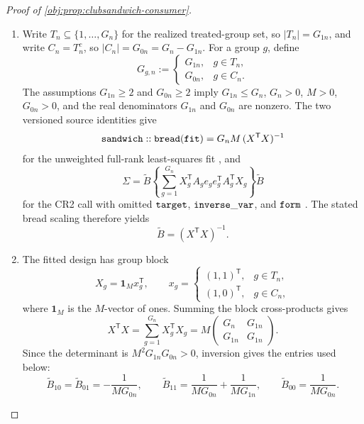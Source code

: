 \documentclass[11pt]{article}
\begin{document}
\begin{proof}[Proof of \cref{obj:prop:clubsandwich-consumer}]
\begin{enumerate}
\item
Write \(T_n\subseteq\{1,\ldots,G_n\}\) for the realized treated-group set, so
\(|T_n|=G_{1n}\), and write \(C_n=T_n^{c}\), so
\(|C_n|=G_{0n}=G_n-G_{1n}\).  For a group \(g\), define
\[
G_{g,n}:=
\begin{cases}
G_{1n},& g\in T_n,\\
G_{0n},& g\in C_n.
\end{cases}
\]
The assumptions \(G_{1n}\ge2\) and \(G_{0n}\ge2\) imply \(G_{1n}\le G_n\),
\(G_n>0\), \(M>0\), \(G_{0n}>0\), and the real denominators
\(G_{1n}\) and \(G_{0n}\) are nonzero.  The two versioned source identities give
\[
{\tt sandwich::bread}({\tt fit})
=
G_nM\,(X^{\mathsf T}X)^{-1}
\]
for the unweighted full-rank least-squares fit
\citep[R/bread.R, lines 10--15]{Sandwich2026}, and
\[
\Sigma
=
\widetilde B
\left\{
\sum_{g=1}^{G_n}X_g^{\mathsf T}A_ge_ge_g^{\mathsf T}A_g^{\mathsf T}X_g
\right\}
\widetilde B
\]
for the CR2 call with omitted \({\tt target}\), \({\tt inverse\_var}\), and
\({\tt form}\)
\citep[R/lm.R, lines 47--52 and 70--72; R/S3-methods.R, lines 21--33 and
63--65; R/clubSandwich.R, lines 167--175, 216--225, and 237--287;
R/CR-adjustments.R, lines 5--7 and 22--42]{ClubSandwich2026}.  The stated bread
scaling therefore yields
\[
\widetilde B=(X^{\mathsf T}X)^{-1}.
\]

\item
The fitted design has group block
\[
X_g=\mathbf 1_M x_g^{\mathsf T},
\qquad
x_g=
\begin{cases}
(1,1)^{\mathsf T},& g\in T_n,\\
(1,0)^{\mathsf T},& g\in C_n,
\end{cases}
\]
where \(\mathbf 1_M\) is the \(M\)-vector of ones.  Summing the block
cross-products gives
\[
X^{\mathsf T}X
=
\sum_{g=1}^{G_n}X_g^{\mathsf T}X_g
=
M
\begin{pmatrix}
G_n&G_{1n}\\
G_{1n}&G_{1n}
\end{pmatrix}.
\]
Since the determinant is \(M^2G_{1n}G_{0n}>0\), inversion gives the entries used
below:
\[
\widetilde B_{10}=\widetilde B_{01}
=-\frac{1}{MG_{0n}},
\qquad
\widetilde B_{11}
=
\frac{1}{MG_{0n}}+\frac{1}{MG_{1n}},
\qquad
\widetilde B_{00}
=
\frac{1}{MG_{0n}}.
\]


\end{enumerate}
\end{proof}
\end{document}
